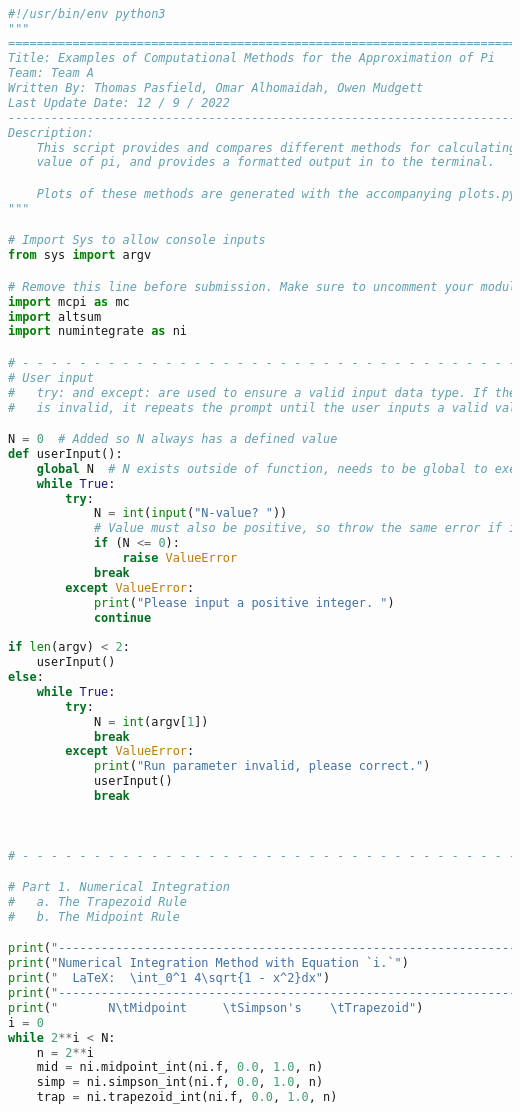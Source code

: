 \documentclass[11pt]{article}
\begin{document}
\begin{lstlisting}[language=Python]

#!/usr/bin/env python3
"""
===============================================================================
Title: Examples of Computational Methods for the Approximation of Pi
Team: Team A
Written By: Thomas Pasfield, Omar Alhomaidah, Owen Mudgett
Last Update Date: 12 / 9 / 2022
-------------------------------------------------------------------------------
Description:
    This script provides and compares different methods for calculating the 
    value of pi, and provides a formatted output in to the terminal.

    Plots of these methods are generated with the accompanying plots.py file.
"""

# Import Sys to allow console inputs
from sys import argv

# Remove this line before submission. Make sure to uncomment your modules
import mcpi as mc
import altsum
import numintegrate as ni

# - - - - - - - - - - - - - - - - - - - - - - - - - - - - - - - - - - - - - - -
# User input
#   try: and except: are used to ensure a valid input data type. If the input
#   is invalid, it repeats the prompt until the user inputs a valid value.

N = 0  # Added so N always has a defined value
def userInput():
    global N  # N exists outside of function, needs to be global to execute.
    while True:
        try:
            N = int(input("N-value? "))
            # Value must also be positive, so throw the same error if it's not.
            if (N <= 0):
                raise ValueError
            break
        except ValueError:
            print("Please input a positive integer. ")
            continue
        
if len(argv) < 2:
    userInput()
else:
    while True:
        try:
            N = int(argv[1])
            break
        except ValueError:
            print("Run parameter invalid, please correct.")
            userInput()
            break
        
        
        
# - - - - - - - - - - - - - - - - - - - - - - - - - - - - - - - - - - - - - - -

# Part 1. Numerical Integration
#   a. The Trapezoid Rule
#   b. The Midpoint Rule

print("----------------------------------------------------------------")
print("Numerical Integration Method with Equation `i.`")
print("  LaTeX:  \int_0^1 4\sqrt{1 - x^2}dx")
print("----------------------------------------------------------------")
print("       N\tMidpoint     \tSimpson's    \tTrapezoid")
i = 0
while 2**i < N:
    n = 2**i
    mid = ni.midpoint_int(ni.f, 0.0, 1.0, n)
    simp = ni.simpson_int(ni.f, 0.0, 1.0, n)
    trap = ni.trapezoid_int(ni.f, 0.0, 1.0, n)
    

\end{lstlisting}
\end{document}
